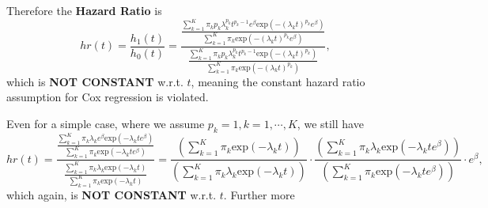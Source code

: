 \documentclass[a4paper,12pt]{article}
\begin{document}
Therefore the \textbf{Hazard Ratio} is
\begin{equation}
  \label{eq:marginal_hr}
  hr\left(t\right) = \frac{h_1\left(t\right)}{h_0\left(t\right)}
  = \frac{
    \frac{
      \sum\limits_{k = 1}^K\pi_k
      p_k\lambda_k^{p_k}t^{p_k - 1}e^\beta
      \mathrm{exp}\left(-\left(\lambda_kt\right)^{p_k}e^\beta\right)
    }{
      \sum\limits_{k = 1}^K\pi_k
      \mathrm{exp}\left(-\left(\lambda_kt\right)^{p_k}e^\beta\right)
    }
  }{
    \frac{
      \sum\limits_{k = 1}^K\pi_k
      p_k\lambda_k^{p_k}t^{p_k - 1}
      \mathrm{exp}\left(-\left(\lambda_kt\right)^{p_k}\right)
    }{
      \sum\limits_{k = 1}^K\pi_k
      \mathrm{exp}\left(-\left(\lambda_kt\right)^{p_k}\right)
    }
  }, 
\end{equation}
which is \textbf{NOT CONSTANT} w.r.t. $t$, meaning the constant hazard ratio assumption for Cox regression is violated.
\par
Even for a simple case, where we assume $p_k = 1, k = 1, \cdots, K$, we still have
\begin{equation}
  \label{eq:marginal_hr_exponential}
  hr(t) = \frac{
    \frac{
      \sum\limits_{k = 1}^K\pi_k
      \lambda_ke^\beta
      \mathrm{exp}\left(-\lambda_kte^\beta\right)
    }{
      \sum\limits_{k = 1}^K\pi_k
      \mathrm{exp}\left(-\lambda_kte^\beta\right)
    }
  }{
    \frac{
      \sum\limits_{k = 1}^K\pi_k
      \lambda_k
      \mathrm{exp}\left(- \lambda_kt\right)
    }{
      \sum\limits_{k = 1}^K\pi_k
      \mathrm{exp}\left(-\lambda_kt\right)
    }
  }
  = \frac{
    \left(
      \sum\limits_{k = 1}^K\pi_k
      \mathrm{exp}\left(-\lambda_kt\right)
    \right)
  }{
    \left(
      \sum\limits_{k = 1}^K\pi_k
      \lambda_k
      \mathrm{exp}\left(- \lambda_kt\right)
    \right)
  }
  \cdot
  \frac{
    \left(
      \sum\limits_{k = 1}^K\pi_k
      \lambda_k
      \mathrm{exp}\left(-\lambda_kte^\beta\right)
    \right)
  }{
    \left(
      \sum\limits_{k = 1}^K\pi_k
      \mathrm{exp}\left(-\lambda_kte^\beta\right)
    \right)
  }
  \cdot
  e^\beta
  , 
\end{equation}
which again, is \textbf{NOT CONSTANT} w.r.t. $t$. Further more
\end{document}
